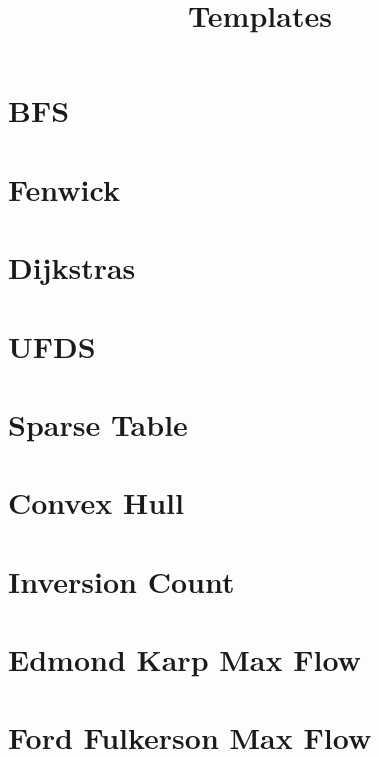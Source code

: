 \documentclass[twocolumn]{article}
\begin{document}
    \title{Templates}
    \lstset{language=c++}
    {\small
    \section{BFS}
    
    \section{Fenwick}
    
    \section{Dijkstras}
    

    \newpage

    \section{UFDS}
    
    \section{Sparse Table}
    
    \section{Convex Hull}
    

    \newpage

    \section{Inversion Count}
    

    \newpage

    \section{Edmond Karp Max Flow}
    

    \newpage

    \section{Ford Fulkerson Max Flow}
    

}
\end{document}
